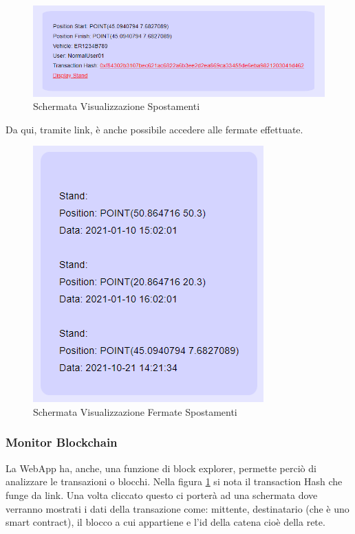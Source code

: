 \documentclass[11pt,a4paper,titlepage]{report}
\begin{document}
\begin{figure}[h]
	\includegraphics[width=\textwidth]{Log_Print}
	\centering
	\caption{Schermata Visualizzazione Spostamenti}
	\label{fig:Log_Print}
\end{figure}

Da qui, tramite link, è anche possibile accedere alle fermate effettuate.
\begin{figure}[h]
	\includegraphics[height=0.35\textheight]{Stand_Print}
	\centering
	\caption{Schermata Visualizzazione Fermate Spostamenti}
	\label{fig:Log_Stand_Print}
\end{figure}

\subsubsection{Monitor Blockchain}
La WebApp ha, anche, una funzione di block explorer, permette perciò di analizzare le transazioni o blocchi. Nella figura  \ref{fig:Log_Print} si nota il transaction Hash che funge da link. Una volta cliccato questo ci porterà ad una schermata dove verranno mostrati i dati della transazione come: mittente, destinatario (che è uno smart contract), il blocco a cui appartiene e l'id della catena cioè della rete.
\end{document}
